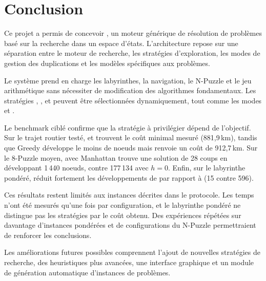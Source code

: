 \section{Conclusion}

Ce projet a permis de concevoir \AUSSI{}, un moteur générique de résolution de
problèmes basé sur la recherche dans un espace d'états. L'architecture repose
sur une séparation entre le moteur de recherche, les stratégies d'exploration,
les modes de gestion des duplications et les modèles spécifiques aux problèmes.

Le système prend en charge les labyrinthes, la navigation, le N-Puzzle et le
jeu arithmétique sans nécessiter de modification des algorithmes fondamentaux.
Les stratégies \BFS{}, \UCS{}, \Greedy{} et \AStar{} peuvent être sélectionnées
dynamiquement, tout comme les modes \TreeSearch{} et \GraphSearch{}.

Le benchmark ciblé confirme que la stratégie à privilégier dépend de
l'objectif. Sur le trajet routier testé, \UCS{} et \AStar{} trouvent le coût
minimal mesuré (881,9\,km), tandis que Greedy développe le moins de noeuds mais
renvoie un coût de 912,7\,km. Sur le 8-Puzzle moyen, \AStar{} avec Manhattan
trouve une solution de 28 coups en développant 1\,440 noeuds, contre 177\,134
avec $h=0$. Enfin, sur le labyrinthe pondéré, \GraphSearch{} réduit fortement
les développements de \UCS{} par rapport à \TreeSearch{} (15 contre 596).

Ces résultats restent limités aux instances décrites dans le protocole. Les
temps n'ont été mesurés qu'une fois par configuration, et le labyrinthe
pondéré ne distingue pas les stratégies par le coût obtenu. Des expériences
répétées sur davantage d'instances pondérées et de configurations du N-Puzzle
permettraient de renforcer les conclusions.

Les améliorations futures possibles comprennent l'ajout de nouvelles stratégies
de recherche, des heuristiques plus avancées, une interface graphique et un
module de génération automatique d'instances de problèmes.